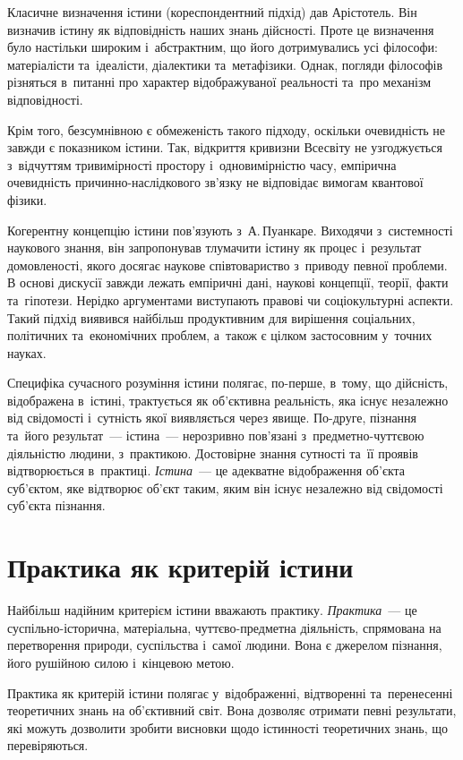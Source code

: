 \documentclass[a5paper,oneside,DIV=12,12pt,headings=small]{scrartcl}
\begin{document}
		Класичне визначення істини (кореспондентний підхід) дав Арістотель. Він визначив істину як відповідність наших знань дійсності. Проте це визначення було настільки широким і~абстрактним, що його дотримувались усі філософи: матеріалісти та~ідеалісти, діалектики та~метафізики. Однак, погляди філософів різняться в~питанні про характер відображуваної реальності та~про механізм відповідності.

		Крім того, безсумнівною є обмеженість такого підходу, оскільки очевидність не завжди є показником істини. Так, відкриття кривизни Всесвіту не узгоджується з~відчуттям тривимірності простору і~одновимірністю часу, емпірична очевидність причинно-наслідкового зв'язку не відповідає вимогам квантової фізики.

		Когерентну концепцію істини пов'язують з~А.\,Пу\-ан\-ка\-ре. Виходячи з~системності наукового знання, він запропонував тлумачити істину як процес і~результат домовленості, якого досягає наукове співтовариство з~приводу певної проблеми. В основі дискусії завжди лежать емпіричні дані, наукові концепції, теорії, факти та~гіпотези. Нерідко аргументами виступають правові чи соціокультурні аспекти. Такий підхід виявився найбільш продуктивним для вирішення соціальних, політичних та~економічних проблем, а~також є цілком застосовним у~точних науках. 

		Специфіка сучасного розуміння істини полягає, по-перше, в~тому, що дійсність, відображена в~істині, трактується як об'\-єк\-тив\-на реальність, яка існує незалежно від свідомості і~сутність якої виявляється через явище. По-друге, пізнання та~його результат~— істина~— нерозривно пов'язані з~предметно-чуттєвою діяльністю людини, з~практикою. Достовірне знання сутності та~її проявів відтворюється в~практиці. \emph{Істина}~— це адекватне відображення об'\-єк\-та суб'\-єк\-том, яке відтворює об'\-єкт таким, яким він існує незалежно від свідомості суб'\-єк\-та пізнання. 

	\section{Практика як критерій істини}
		Найбільш надійним критерієм істини вважають практику. \emph{Практика}~— це суспільно-історична, матеріальна, чуттєво-предметна діяльність, спрямована на перетворення природи, суспільства і~самої людини. Вона є джерелом пізнання, його рушійною силою і~кінцевою метою.

		Практика як критерій істини полягає у~відображенні, відтворенні та~перенесенні теоретичних знань на об'\-єк\-тив\-ний світ. Вона дозволяє отримати певні результати, які можуть дозволити зробити висновки щодо істинності теоретичних знань, що перевіряються.
\end{document}
